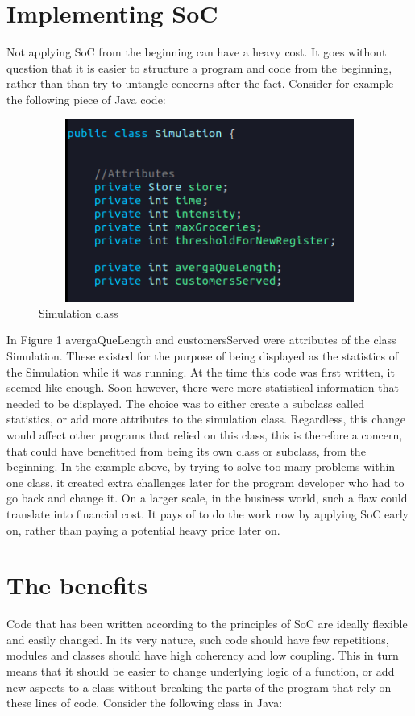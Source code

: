 \documentclass[11pt,a4paper]{article}
\begin{document}
\begin{flushleft}
\section{Implementing SoC}

Not applying SoC from the beginning can have a heavy cost. It goes without question that it is easier to structure a program and code from the beginning, rather than than try to untangle concerns after the fact. Consider for example the following piece of Java code: 

\begin{figure}[h!]
  \includegraphics[width=15cm,height=6cm,keepaspectratio,]{Images/simulation}
  \caption{Simulation class}
  \label{Figure 1.1}
\end{figure}

In Figure 1 avergaQueLength and customersServed were attributes of the class Simulation. These existed for the purpose of being displayed as the statistics of the Simulation while it was running. At the time this code was first written, it seemed like enough. Soon however, there were more statistical information that needed to be displayed.  The choice was to either create a subclass called statistics, or add more attributes to the simulation class. Regardless, this change would affect other programs that relied on this class, this is therefore a concern, that could have benefitted from being its own class or subclass, from the beginning. In the example above, by trying to solve too many problems within one class, it created extra challenges later for the program developer who had to go back and change it. On a larger scale, in the business world, such a flaw could translate into financial cost. It pays of to do the work now by applying SoC early on, rather than paying a potential heavy price later on.

\section{The benefits}
Code that has been written according to the principles of SoC are ideally flexible and easily changed. In its very nature, such code should have few repetitions, modules and classes should have high coherency and low coupling. This in turn means that it should be easier to change underlying logic of a function, or add new aspects to a class without breaking the parts of the program that rely on these lines of code. Consider the following class in Java:     \linebreak


\end{flushleft}
\end{document}
